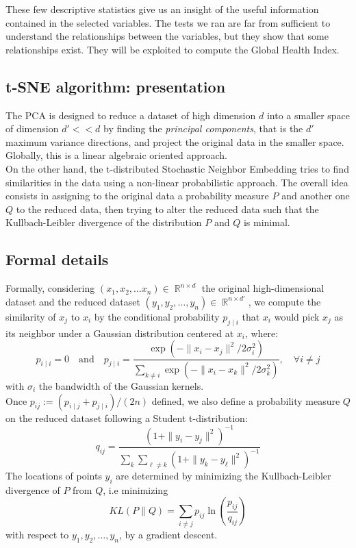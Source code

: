 \documentclass[]{article}
\DeclareMathOperator*{\R}{\mathbb{R}}
\begin{document}
\noindent
These few descriptive statistics give us an insight of the useful information contained in the selected variables. The tests we ran are far from sufficient to understand the relationships between the variables, but they show that some relationships exist. They will be exploited to compute the Global Health Index.

\subsection{t-SNE algorithm: presentation}
The PCA is designed to reduce a dataset of high dimension $d$ into a smaller space of dimension $d'<\!<d$ by finding the \textit{principal components}, that is the $d'$ maximum variance directions, and project the original data in the smaller space. Globally, this is a linear algebraic oriented approach.\\
On the other hand, the t-distributed Stochastic Neighbor Embedding tries to find similarities in the data using a non-linear probabilistic approach. The overall idea consists in assigning to the original data a probability measure $P$ and another one $Q$ to the reduced data, then trying to alter the reduced data such that the Kullbach-Leibler divergence of the distribution $P$ and $Q$ is minimal.
\subsection{Formal details}
Formally, considering $(x_1, x_2,\dots x_n) \in \R^{n\times d}$ the original high-dimensional dataset and the reduced dataset $(y_1,y_2,\dots, y_n)\in \R^{n\times d'}$, we compute the similarity of $x_j$ to $x_i$ by the conditional probability $p_{j\mid i}$ that $x_i$ would pick $x_j$ as its neighbor under a Gaussian distribution centered at $x_i$, where:
\begin{equation}
	p_{i\mid i} = 0\quad \text{and}\quad
	p_{j\mid i} = \frac{\exp(-\|x_i - x_j\|^2/2\sigma_i^2)}{\sum_{k\ne i}\exp(-\|x_i - x_k\|^2/2\sigma_k^2)}, \quad \forall i\ne j
\end{equation}
with $\sigma_i$ the bandwidth of the Gaussian kernels.\\
Once $p_{ij} := (p_{i\mid j} + p_{j\mid i})/(2n)$ defined, we also define a probability measure $Q$ on the reduced dataset following a Student t-distribution:
\begin{equation}
	q_{ij} = \frac{(1+\|y_i-y_j\|^2)^{-1}}{\sum_k \sum_{\ell \ne k}	(1+\|y_k-y_{\ell}\|^2)^{-1}}
\end{equation}
The locations of points $y_i$ are determined by minimizing the Kullbach-Leibler divergence of $P$ from $Q$, i.e minimizing
\begin{equation}
	KL(P\|Q) = \sum_{i\ne j}p_{ij} \ln\left(\frac{p_{ij}}{q_{ij}}\right)
\end{equation}
with respect to $y_1,y_2,\dots, y_n$, by a gradient descent.\\
\end{document}
